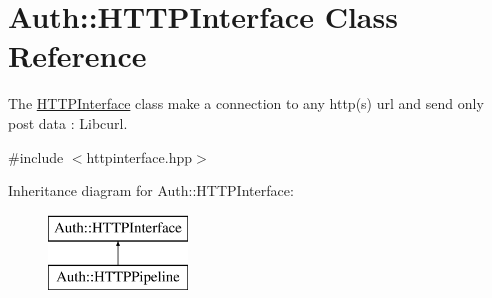 \hypertarget{classAuth_1_1HTTPInterface}{}\section{Auth\+:\+:H\+T\+T\+P\+Interface Class Reference}
\label{classAuth_1_1HTTPInterface}


The \hyperlink{classAuth_1_1HTTPInterface}{H\+T\+T\+P\+Interface} class make a connection to any http(s) url and send only post data \+: Libcurl.  




{\ttfamily \#include $<$httpinterface.\+hpp$>$}

Inheritance diagram for Auth\+:\+:H\+T\+T\+P\+Interface\+:\begin{figure}[H]
\begin{center}
\leavevmode
\includegraphics[height=2.000000cm]{d0/d9a/classAuth_1_1HTTPInterface}
\end{center}
\end{figure}
